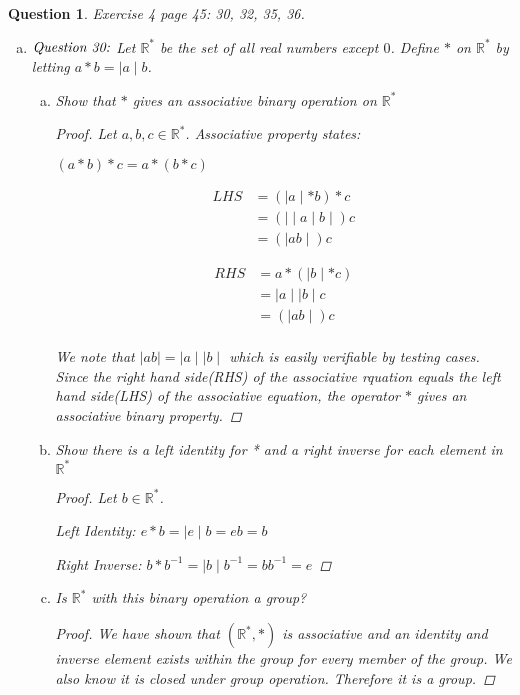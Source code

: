 \documentclass{article}
\newcommand*{\field}[1]{\mathbb{#1}}%
\newtheorem{ques}{Question}
\begin{document}
\begin{ques}
	Exercise 4 page 45: 30, 32, 35, 36.
	\begin{enumerate}[(a)]
		\item 
		$\emph{Question 30:}$ Let $\field{R}^*$ be the set of all real numbers except $0$. Define $*$ on $\field{R}^*$ by letting $a * b = \mid a\mid b$.
		\begin{enumerate}[(a)]
			\item 
			Show that $*$ gives an associative binary operation on $\field{R}^*$
			\begin{proof}
				Let $a,b,c \in \field{R}^*$. Associative property states: 
				
				$(a * b) * c = a * (b * c)$
				
				\begin{align*} 
				LHS &= (\mid a\mid * b) *c \\
				&= (\mid \mid a\mid b\mid) c \\
				&= (\mid ab \mid) c
				\end{align*}
				
				\begin{align*} 
				RHS &= a * (\mid b\mid * c) \\
				&= \mid a\mid \mid b\mid c \\
				&= (\mid ab \mid) c \\
				\end{align*}
				
				 We note that $\mid ab\mid = \mid a\mid \mid b\mid$ which is easily verifiable by testing cases. Since the right hand side(RHS) of the associative rquation equals the left hand side(LHS) of the associative equation, the operator $*$ gives an associative binary property.
			\end{proof}
		
			\item
			Show there is a left identity for * and a right inverse for each element in $\field{R}^*$
			\begin{proof}
				Let $b \in \field{R}^*$.
				
				Left Identity: $e * b = \mid e\mid b = eb = b$
				
				Right Inverse: $b * b^{-1} = \mid b\mid b^{-1} = bb^{-1} = e$
			\end{proof}
		
			\item
			Is $\field{R}^*$ with this binary operation a group?
			\begin{proof}
			We have shown that $(\field{R}^*, *)$ is associative and an identity and inverse element exists within the group for every member of the group. We also know it is closed under group operation. Therefore it is a group.
			\end{proof}
	

\end{enumerate}
\end{enumerate}
\end{ques}
\end{document}
